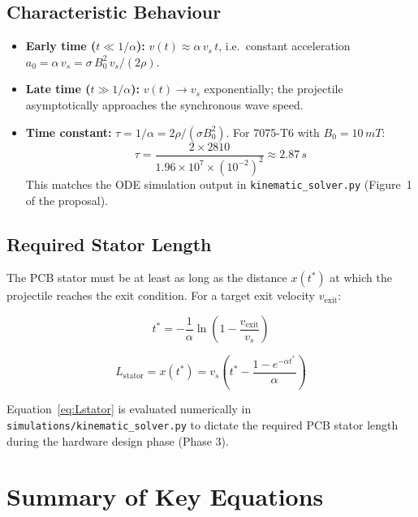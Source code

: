 \documentclass[12pt, a4paper]{article}
\theoremstyle{plain}
\theoremstyle{definition}
\newcommand{\sig}{\sigma}
\begin{document}
\subsection{Characteristic Behaviour}

\begin{itemize}
  \item \textbf{Early time ($t \ll 1/\alpha$):} $v(t) \approx \alpha\,v_s\,t$, i.e.\
        constant acceleration $a_0 = \alpha\,v_s = \sig\,B_0^2\,v_s/(2\rho)$.
  \item \textbf{Late time ($t \gg 1/\alpha$):} $v(t) \to v_s$ exponentially; the
        projectile asymptotically approaches the synchronous wave speed.
  \item \textbf{Time constant:} $\tau = 1/\alpha = 2\rho/(\sig B_0^2)$.
        For 7075-T6 with $B_0 = 10\,\si{mT}$:
        \[
          \tau = \frac{2 \times 2810}{1.96\times10^7 \times (10^{-2})^2}
               \approx 2.87\,\si{s}
        \]
        This matches the ODE simulation output in \texttt{kinematic\_solver.py}
        (Figure~1 of the proposal).
\end{itemize}

\subsection{Required Stator Length}

The PCB stator must be at least as long as the distance $x(t^*)$ at which the
projectile reaches the exit condition. For a target exit velocity $v_{\mathrm{exit}}$:

\begin{equation}
  t^* = -\frac{1}{\alpha}\ln\!\left(1 - \frac{v_{\mathrm{exit}}}{v_s}\right)
\end{equation}

\begin{equation}
  L_{\mathrm{stator}} = x(t^*)
  = v_s\left(t^* - \frac{1 - e^{-\alpha t^*}}{\alpha}\right)
  \label{eq:Lstator}
\end{equation}

Equation~\eqref{eq:Lstator} is evaluated numerically in
\texttt{simulations/kinematic\_solver.py} to dictate the required PCB stator length
during the hardware design phase (Phase 3).


\section{Summary of Key Equations}
\label{sec:summary}
\end{document}
